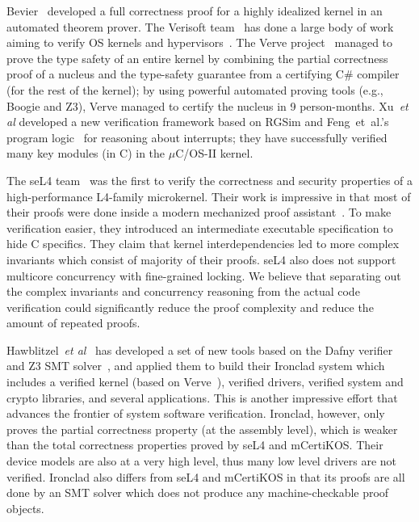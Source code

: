 Bevier~\cite{bevier89} developed a full correctness proof
for a highly idealized kernel in an automated theorem prover. The
Verisoft team~\cite{verisoft07} has done a large body of work aiming
to verify OS kernels and
hypervisors~\cite{leinenbach09,alkassar10}. The Verve
project~\cite{hawblitzel10} managed to prove the type safety of an
entire kernel by combining the partial correctness proof of a nucleus
and the type-safety guarantee from a certifying C\# compiler (for the
rest of the kernel); by using powerful automated proving tools (e.g.,
Boogie and Z3), Verve managed to certify the nucleus in 9
person-months.
Xu~{\em et al} \cite{xu16} developed a new verification framework based on RGSim
and Feng~{et~al.}'s program logic~\cite{feng08:aim} for reasoning
about interrupts; they have successfully verified many key modules
(in C) in the $\mu$C/OS-II kernel.

The seL4 team~\cite{klein2009sel4} was the first to verify the
correctness and security properties of a high-performance L4-family
microkernel. Their work is impressive in that most of their proofs
were done inside a modern mechanized proof
assistant~\cite{Paulson:Isabelle}.  To make verification easier, they
introduced an intermediate executable specification to hide C
specifics. They claim that kernel
interdependencies led to more complex invariants which consist
of majority of their proofs. seL4 also does not support multicore
concurrency with fine-grained locking. 
We believe that separating out the complex invariants and concurrency
reasoning from the actual code verification could significantly reduce
the proof complexity and reduce the amount of repeated proofs.

Hawblitzel~{\em et al}~\cite{ironclad14} has developed a set
of new tools based on the Dafny verifier~\cite{dafny10} and Z3 SMT
solver~\cite{moura08}, and applied them to build their Ironclad system
which includes a verified kernel (based on Verve~\cite{hawblitzel10}),
verified drivers, verified system and crypto libraries, and several
applications.  This is another impressive effort that advances the
frontier of system software verification. Ironclad, however, only
proves the partial correctness property (at the assembly level), which
is weaker than the total correctness properties proved by seL4 and
mCertiKOS. 
Their device models are also at a very high level, thus many low level
drivers are not verified. Ironclad also differs
from seL4 and mCertiKOS in that its proofs are all done by an SMT solver
which does not produce any machine-checkable proof objects.

